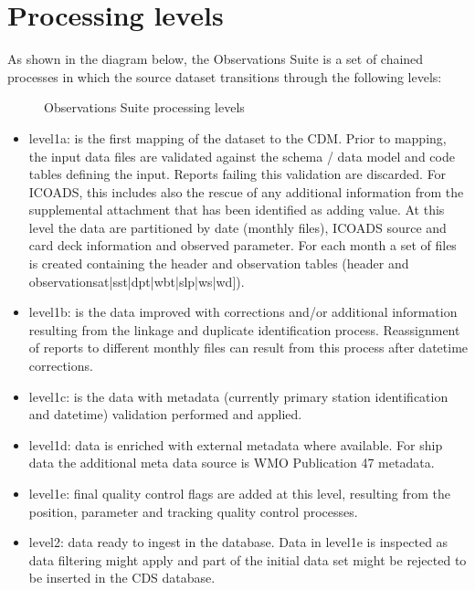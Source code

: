 \documentclass[letterpaper,10pt,english]{sphinxmanual}
\let\sphinxpxdimen\pdfpxdimen\else\newdimen\sphinxpxdimen
\begin{document}
\chapter{Processing levels}
\label{\detokenize{index:processing-levels}}
As shown in the diagram below, the Observations Suite is a set of chained
processes in which the source dataset transitions through the following levels:

\begin{figure}[htbp]
\centering
\capstart

\noindent\sphinxincludegraphics[width=500\sphinxpxdimen]{{obs_suite_levels}.png}
\caption{Observations Suite processing levels}\label{\detokenize{index:id4}}\end{figure}
\begin{itemize}
\item {} 
level1a: is the first mapping of the dataset to the CDM. Prior to mapping,
the input data files are validated against the schema / data model and code
tables defining the input. Reports failing this validation are discarded. For
ICOADS, this includes also the rescue of any additional information from the
supplemental attachment that has been identified as adding value. At this
level the data are partitioned by date (monthly files), ICOADS source and card
deck information and observed parameter. For each month a set of files is
created containing the header and observation tables (header and
observations\sphinxhyphen{}{[}at|sst|dpt|wbt|slp|ws|wd{]}).

\item {} 
level1b: is the data improved with corrections and/or additional information
resulting from the linkage and duplicate identification process. Reassignment of
reports to different monthly files can result from this process after datetime
corrections.

\item {} 
level1c: is the data with metadata (currently primary station identification
and datetime) validation performed and applied.

\item {} 
level1d: data is enriched with external meta\sphinxhyphen{}data where available. For ship
data the additional meta data source is WMO Publication 47 metadata.

\item {} 
level1e: final quality control flags are added at this level, resulting from
the position, parameter and tracking quality control processes.

\item {} 
level2: data ready to ingest in the database. Data in level1e is inspected as
data filtering might apply and part of the initial data set might be rejected
to be inserted in the CDS database.

\end{itemize}
\end{document}
